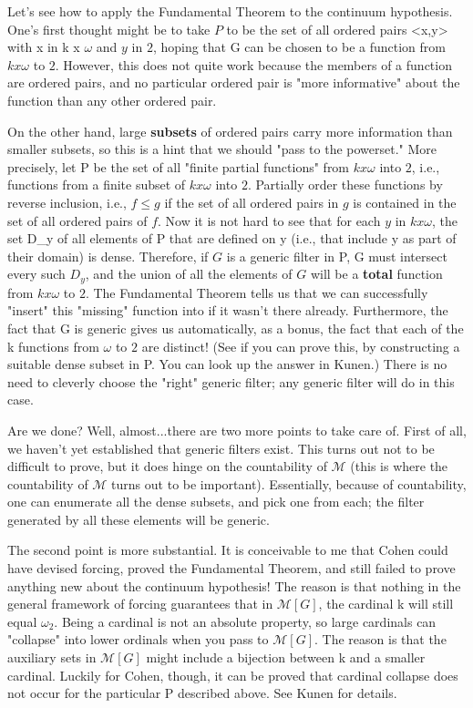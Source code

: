 \documentclass[10pt]{article}
\theoremstyle{definition}
\begin{document}
Let's see how to apply the Fundamental Theorem to the continuum hypothesis.
One's first thought might be to take $P$ to be the set of all ordered pairs
<x,y> with x in k x $\omega$ and $y$ in $2$, hoping that G can be chosen to be a
function from $k x \omega$ to $2$.  However, this does not quite work because the
members of a function are ordered pairs, and no particular ordered pair is
"more informative" about the function than any other ordered pair.

On the other hand, large \textbf{subsets} of ordered pairs carry more information
than smaller subsets, so this is a hint that we should "pass to the
powerset."  More precisely, let P be the set of all "finite partial
functions" from $k x \omega$ into $2$, i.e., functions from a finite subset of $k
x \omega$ into $2$.  Partially order these functions by reverse inclusion, i.e.,
$f \leq g$ if the set of all ordered pairs in $g$ is contained in the set of all
ordered pairs of $f$.  Now it is not hard to see that for each $y$ in $k x \omega$,
the set D_y of all elements of P that are defined on y (i.e., that include y
as part of their domain) is dense.  Therefore, if $G$ is a generic filter in
P, G must intersect every such $D_y$, and the union of all the elements of $G$
will be a \textbf{total} function from $k x \omega$ to $2$.  The Fundamental Theorem
tells us that we can successfully "insert" this "missing" function into  if
it wasn't there already.  Furthermore, the fact that G is generic gives us
automatically, as a bonus, the fact that each of the k functions from $\omega$
to $2$ are distinct!  (See if you can prove this, by constructing a suitable
dense subset in P.  You can look up the answer in Kunen.)  There is no need
to cleverly choose the "right" generic filter; any generic filter will do
in this case.

Are we done?  Well, almost...there are two more points to take care of.
First of all, we haven't yet established that generic filters exist.
This turns out not to be difficult to prove, but it does hinge on the
countability of $\mathcal{M}$ (this is where the countability of $\mathcal{M}$ turns out to be
important).  Essentially, because of countability, one can enumerate all
the dense subsets, and pick one from each; the filter generated by all
these elements will be generic.

The second point is more substantial.  It is conceivable to me that
Cohen could have devised forcing, proved the Fundamental Theorem, and
still failed to prove anything new about the continuum hypothesis!  The
reason is that nothing in the general framework of forcing guarantees
that in $\mathcal{M}[G]$, the cardinal k will still equal $\omega_2$.  Being a
cardinal is not an absolute property, so large cardinals can "collapse"
into lower ordinals when you pass to $\mathcal{M}[G]$.  The reason is that the
auxiliary sets in $\mathcal{M}[G]$ might include a bijection between k and a
smaller cardinal.  Luckily for Cohen, though, it can be proved that
cardinal collapse does not occur for the particular P described above.
See Kunen for details.
\end{document}
